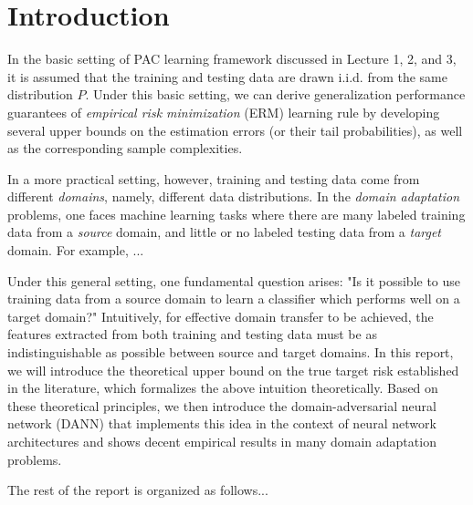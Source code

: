 \section{Introduction}
In the basic setting of PAC learning framework discussed in Lecture 1, 2, and 3, it is assumed that the training and testing data are drawn i.i.d. from the same distribution $P$. Under this basic setting, we can derive generalization performance guarantees of \textit{empirical risk minimization} (ERM) learning rule by developing several upper bounds on the estimation errors (or their tail probabilities), as well as the corresponding sample complexities.

In a more practical setting, however, training and testing data come from different \textit{domains}, namely, different data distributions. In the \textit{domain adaptation} problems, one faces machine learning tasks where there are many labeled training data from a \textit{source} domain, and little or no labeled testing data from a \textit{target} domain. For example, ...

Under this general setting, one fundamental question arises: "Is it possible to use training data from a source domain to learn a classifier which performs well on a target domain?" Intuitively, for effective domain transfer to be achieved, the features extracted from both training and testing data must be as indistinguishable as possible between source and target domains. In this report, we will introduce the theoretical upper bound on the true target risk established in the literature, which formalizes the above intuition theoretically. Based on these theoretical principles, we then introduce the domain-adversarial neural network (DANN) that implements this idea in the context of neural network architectures and shows decent empirical results in many domain adaptation problems.

The rest of the report is organized as follows...